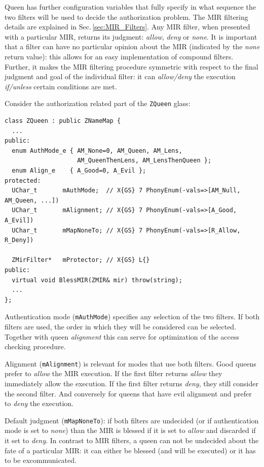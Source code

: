 \documentclass[a4paper,11pt]{article}
\def\smalltt#1{{\small\texttt{#1}}}
\begin{document}
Queen has further configuration variables that fully specify in what
sequence the two filters will be used to decide the authorization
problem. The MIR filtering details are explained in
Sec.\,\ref{sec:MIR_Filters}. Any MIR filter, when presented with a
particular MIR, returns its judgment: \emph{allow}, \emph{deny} or
\emph{none}. It is important that a filter can have no particular
opinion about the MIR (indicated by the \emph{none} return value):
this allows for an easy implementation of compound filters. Further,
it makes the MIR filtering procedure symmetric with respect to the
final judgment and goal of the individual filter: it can
\emph{allow/deny} the execution \emph{if/unless} certain
conditions are met.

Consider the authorization related part of the \smalltt{ZQueen} glass:
{\footnotesize\begin{verbatim}
class ZQueen : public ZNameMap {
  ...
public:
  enum AuthMode_e { AM_None=0, AM_Queen, AM_Lens,
                    AM_QueenThenLens, AM_LensThenQueen };
  enum Align_e    { A_Good=0, A_Evil };
protected:
  UChar_t       mAuthMode;  // X{GS} 7 PhonyEnum(-vals=>[AM_Null, AM_Queen, ...])
  UChar_t       mAlignment; // X{GS} 7 PhonyEnum(-vals=>[A_Good, A_Evil])
  UChar_t       mMapNoneTo; // X{GS} 7 PhonyEnum(-vals=>[R_Allow, R_Deny])

  ZMirFilter*   mProtector; // X{GS} L{}
public:
  virtual void BlessMIR(ZMIR& mir) throw(string);
  ...
};
\end{verbatim}
}

Authentication mode (\smalltt{mAuthMode}) specifies any selection of
the two filters. If both filters are used, the order in which they
will be considered can be selected. Together with queen
\emph{alignment} this can serve for optimization of the access
checking procedure.

Alignment (\smalltt{mAlignment}) is relevant for modes that use both
filters. Good queens prefer to \emph{allow} the MIR execution. If the
first filter returns \emph{allow} they immediately allow the
execution. If the first filter returns \emph{deny}, they still
consider the second filter. And conversely for queens that have evil
alignment and prefer to \emph{deny} the execution.

Default judgment (\smalltt{mMapNoneTo}): if both filters are undecided
(or if authentication mode is set to \emph{none}) than the MIR is
blessed if it is set to \emph{allow} and discarded if it set to
\emph{deny}.  In contrast to MIR filters, a queen can not be undecided
about the fate of a particular MIR: it can either be blessed (and will
be executed) or it has to be excommunicated.
\end{document}
